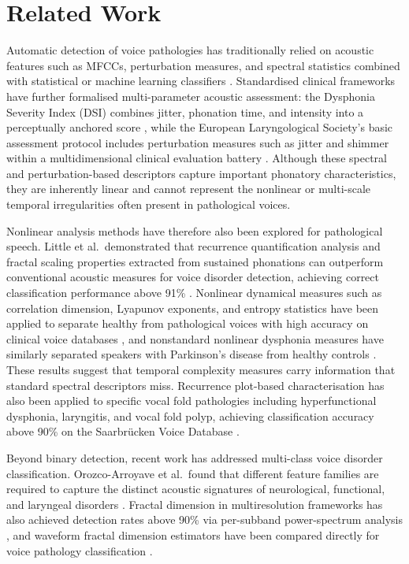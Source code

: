 \documentclass[runningheads]{llncs}
\begin{document}
  \section{Related Work}
  \label{sec:related_work}

  Automatic detection of voice pathologies has traditionally relied on acoustic features such as MFCCs, perturbation measures, and spectral statistics combined with statistical or machine learning classifiers \cite{godino2006,alnasheri2017,rai2025}. Standardised clinical frameworks have further formalised multi-parameter acoustic assessment: the Dysphonia Severity Index (DSI) combines jitter, phonation time, and intensity into a perceptually anchored score \cite{wuyts2000}, while the European Laryngological Society's basic assessment protocol includes perturbation measures such as jitter and shimmer within a multidimensional clinical evaluation battery \cite{dejonckere2001}. Although these spectral and perturbation-based descriptors capture important phonatory characteristics, they are inherently linear and cannot represent the nonlinear or multi-scale temporal irregularities often present in pathological voices.

  Nonlinear analysis methods have therefore also been explored for pathological speech. Little et al.\ demonstrated that recurrence quantification analysis and fractal scaling properties extracted from sustained phonations can outperform conventional acoustic measures for voice disorder detection, achieving correct classification performance above 91\% \cite{little2007b}. Nonlinear dynamical measures such as correlation dimension, Lyapunov exponents, and entropy statistics have been applied to separate healthy from pathological voices with high accuracy on clinical voice databases \cite{henriquez2009}, and nonstandard nonlinear dysphonia measures have similarly separated speakers with Parkinson's disease from healthy controls \cite{little2009}. These results suggest that temporal complexity measures carry information that standard spectral descriptors miss. Recurrence plot-based characterisation has also been applied to specific vocal fold pathologies including hyperfunctional dysphonia, laryngitis, and vocal fold polyp, achieving classification accuracy above 90\% on the Saarbrücken Voice Database \cite{krishnan2026}.

  Beyond binary detection, recent work has addressed multi-class voice disorder classification. Orozco-Arroyave et al.\ found that different feature families are required to capture the distinct acoustic signatures of neurological, functional, and laryngeal disorders \cite{orozco2015}. Fractal dimension in multiresolution frameworks has also achieved detection rates above 90\% via per-subband power-spectrum analysis \cite{ali2016}, and waveform fractal dimension estimators have been compared directly for voice pathology classification \cite{baljekar2012}.
\end{document}
